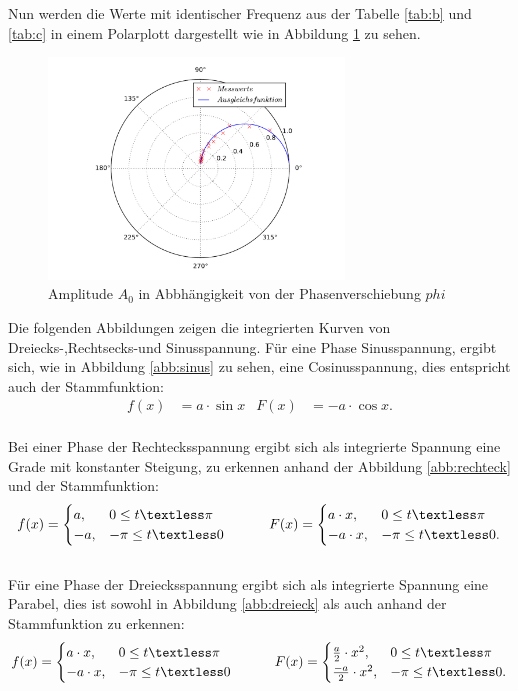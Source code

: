 \newpage
Nun werden die Werte mit identischer Frequenz
aus der Tabelle \ref{tab:b} und \ref{tab:c} in einem
Polarplott dargestellt wie in Abbildung \ref{abb:d} zu sehen.
\begin{figure}
\centering
\includegraphics[width=0.7\textwidth]{d.pdf}
\caption{Amplitude $A_0$ in Abbhängigkeit von der Phasenverschiebung $phi$ }
\label{abb:d}
\end{figure}
\FloatBarrier
Die folgenden Abbildungen zeigen die integrierten Kurven von Dreiecks-,Rechtsecks-und Sinusspannung.
Für eine Phase Sinusspannung, ergibt sich, wie in Abbildung \ref{abb:sinus} zu sehen, eine Cosinusspannung, dies entspricht auch der Stammfunktion:
\begin{align}
  f(x)&=a\cdot \sin{x}&F(x)&=-a\cdot \cos{x}.
\end{align}\\
Bei einer Phase der Rechtecksspannung ergibt sich als integrierte Spannung eine Grade mit konstanter Steigung,
zu erkennen anhand der Abbildung \ref{abb:rechteck} und der Stammfunktion:
\begin{align}
  f(x)=
  \begin{cases}
    a,& 0 \leq t \textless \pi\\
   -a,& -\pi \leq t \textless 0
  \end{cases}
  \ \ \ \ \ \ \ \ \
  F(x)=
  \begin{cases}
    a\cdot x,& 0 \leq t \textless \pi\\
   -a\cdot x,&  -\pi \leq t \textless 0.
  \end{cases}
\end{align}\\
Für eine Phase der Dreiecksspannung ergibt sich als integrierte Spannung eine Parabel, dies ist sowohl in Abbildung \ref{abb:dreieck} als auch anhand der Stammfunktion zu erkennen:
\begin{align}
  f(x)=
  \begin{cases}
    a\cdot x,& 0 \leq t \textless \pi\\
   -a\cdot x,&  -\pi \leq t \textless 0
  \end{cases}
  \ \ \ \ \ \ \ \ \
  F(x)=
  \begin{cases}
    \frac{a}{2}\cdot x^2,& 0 \leq t \textless \pi\\
   \frac{-a}{2}\cdot x^2,&  -\pi \leq t \textless 0.
  \end{cases}
\end{align}\\
